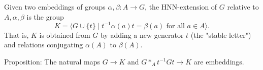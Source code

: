 Given two embeddings of groups $\alpha, \beta: A \to G$, the HNN-extension of $G$ relative to $A, \alpha, \beta$ is the group
$$K = \langle G \cup \{t\} \mid t^{-1} \alpha(a)t = \beta(a) \text{ for all } a \in A \rangle.$$
That is, $K$ is obtained from $G$ by adding a new generator $t$ (the "stable letter") and relations conjugating $\alpha(A)$ to $\beta(A)$.

Proposition: The natural maps $G \to K$ and $G *_A t^{-1}Gt \to K$ are embeddings.